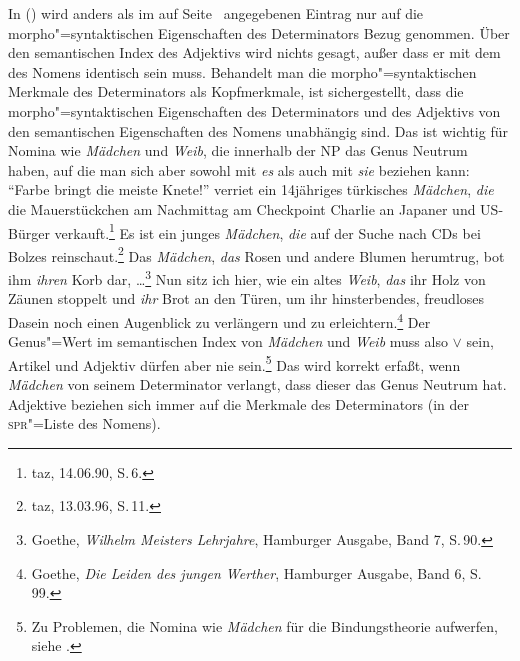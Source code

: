 \noindent
In () wird anders als im auf Seite~\pageref{le-interessantes-sem}
angegebenen Eintrag nur auf die morpho"=syntaktischen Eigenschaften des Determinators Bezug genommen.
Über den semantischen Index des Adjektivs wird nichts gesagt, außer dass er mit dem des Nomens
identisch sein muss. Behandelt man die morpho"=syntaktischen Merkmale des Determinators als
Kopfmerkmale, ist sichergestellt, dass die morpho"=syntaktischen Eigenschaften
des Determinators und des Adjektivs von den semantischen Eigenschaften des Nomens unabhängig sind.
Das ist wichtig für Nomina wie \emph{Mädchen} und \emph{Weib}, die innerhalb der NP das Genus Neutrum
haben, auf die man sich aber sowohl mit \emph{es} als auch mit \emph{sie} beziehen kann:
\eal
\ex "`Farbe bringt die meiste Knete!"' verriet ein 14jähriges türkisches {\em Mädchen\/}, {\em die\/} die Mauerstückchen am
      Nachmittag am Checkpoint Charlie an Japaner und US-Bürger verkauft.\footnote{
        taz, 14.06.90, S.\,6.
      }
\ex Es ist ein junges {\em Mädchen\/}, {\em die\/} auf der Suche nach CDs bei Bolzes reinschaut.\footnote{
        taz, 13.03.96, S.\,11.
      }
\zl
\eal
\label{bsp-neu-neu-goethe}
\ex Das {\em Mädchen\/}, {\em das\/} Rosen und andere Blumen herumtrug, bot ihm \emph{ihren} Korb
dar, \ldots\footnote{
        Goethe, {\em Wilhelm Meisters Lehrjahre\/}, Hamburger Ausgabe, Band 7, S.\,90.
      }
\ex Nun sitz ich hier, wie ein altes {\em Weib\/}, {\em das\/} ihr Holz von Zäunen stoppelt
      und \emph{ihr} Brot an den Türen, um ihr hinsterbendes, freudloses Dasein noch einen
      Augenblick zu verlängern und zu erleichtern.\footnote{
        Goethe, {\em Die Leiden des jungen Werther\/}, Hamburger Ausgabe, Band 6, S.\,99.
      }\label{bsp-goethe-altes-weib}
\zl
Der Genus"=Wert im semantischen Index von \emph{Mädchen} und \emph{Weib} muss also  $\vee$  sein, Artikel
und Adjektiv dürfen aber nie  sein.\footnote{
  Zu Problemen, die Nomina wie \emph{Mädchen} für die Bindungstheorie aufwerfen,
  siehe .%
}
Das wird korrekt erfaßt, wenn \emph{Mädchen} von seinem Determinator verlangt,
dass dieser das Genus Neutrum hat. Adjektive beziehen sich immer auf die Merkmale des Determinators (in der \textsc{spr}"=Liste
des Nomens).

